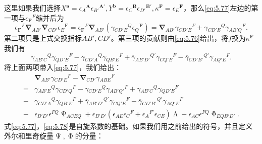 这里如果我们选择$X^{\boldsymbol{a}} =\epsilon {_{A}}^{\boldsymbol{A}} \epsilon {_{B'}}^{\boldsymbol{A} '} ,Y^{\boldsymbol{b}} =\epsilon {_{C}}^{\boldsymbol{B}} \epsilon {_{D'}}^{\boldsymbol{B} '} ,\kappa ^{\boldsymbol{F}} =\epsilon {_{E}}^{\boldsymbol{F}}$，那么\ref{eq:5.77}左边的第一项与$\epsilon {_{\boldsymbol{F}}}^{F}$缩并后为
\begin{equation*}
	\epsilon {_{\boldsymbol{F}}}^{F}\boldsymbol{\nabla }_{AB'}\boldsymbol{\nabla }_{CD'} \epsilon {_{E}}^{\boldsymbol{F}} =\epsilon {_{\boldsymbol{F}}}^{F}\boldsymbol{\nabla }_{AB'} (\gamma {_{CD'E}}^{Q} \epsilon {_{Q}}^{\boldsymbol{F}} )=\boldsymbol{\nabla }_{AB'} \gamma {_{CD'E}}^{F} +\gamma {_{CD'E}}^{Q} \gamma {_{AB'Q}}^{F} .
\end{equation*}
第二项只是上式交换指标$AB',CD'$。第三项的贡献则由\ref{eq:5.76}给出，将$f$换为$\kappa ^{\boldsymbol{F}}$我们有
\begin{equation*}
	\gamma {_{AB'C}}^{Q} \gamma {_{QD'E}}^{F} -\gamma {_{CD'A}}^{Q} \gamma {_{QB'E}}^{F} +\overline{\gamma }{_{AB'D'}}^{Q'} \gamma {_{CQ'E}}^{F} -\overline{\gamma }{_{CD'B'}}^{Q'} \gamma {_{AQ'E}}^{F} .
\end{equation*}
将上面两项带入\ref{eq:5.77}，我们给出：
\begin{equation}
	\begin{aligned}
		& \boldsymbol{\nabla }_{AB'} \gamma {_{CD'E}}^{F} -\boldsymbol{\nabla }_{CD'} \gamma {_{ABE}}^{F}\\
		= & \gamma {_{AB'E}}^{Q} \gamma {_{CD'Q}}^{F} -\gamma {_{CD'E}}^{Q} \gamma {_{AB'Q'}}^{F} +\gamma {_{AB'C}}^{Q} \gamma {_{QD'E}}^{F}\\
		- & \gamma {_{CD'A}}^{Q} \gamma {_{QB'E}}^{F} +\overline{\gamma }{_{AB'D'}}^{Q'} \gamma {_{CQ'E}}^{F} -\overline{\gamma }{_{CD'B'}}^{Q'} \gamma {_{AQ'E}}^{F}\\
		+ & \epsilon _{B'D'} \epsilon ^{FQ} \upPsi _{ACEQ} +\epsilon _{B'D'} (\epsilon _{AE} \epsilon {_{C}}^{F} +\epsilon {_{A}}^{F'} \epsilon _{CE} )\upLambda +\epsilon _{AC} \epsilon ^{FQ} \upPhi _{EQB'D'} .
	\end{aligned}
	\label{eq:5.78}
\end{equation}
式\ref{eq:5.77}，\ref{eq:5.78}是自旋系数的基础。如果我们用之前给出的符号，并且定义外尔和里奇旋量$\upPsi ,\upPhi $的分量：
